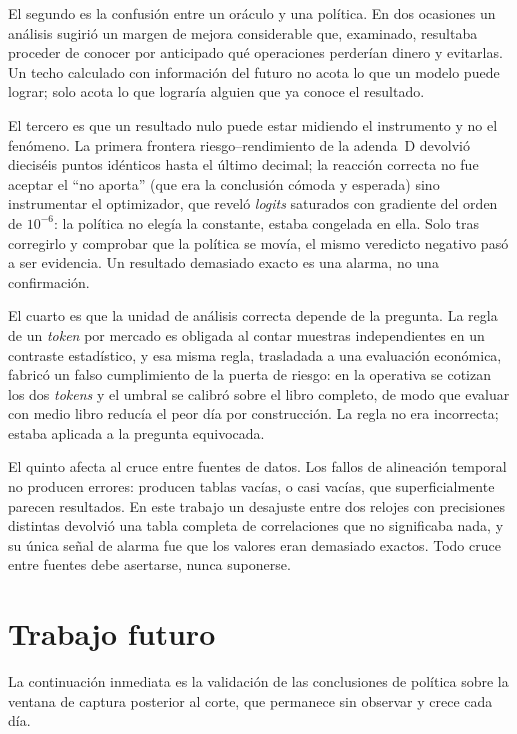 El segundo es la confusión entre un oráculo y una política. En dos ocasiones un análisis
sugirió un margen de mejora considerable que, examinado, resultaba proceder de conocer por
anticipado qué operaciones perderían dinero y evitarlas. Un techo calculado con información
del futuro no acota lo que un modelo puede lograr; solo acota lo que lograría alguien que ya
conoce el resultado.

El tercero es que un resultado nulo puede estar midiendo el instrumento y no el fenómeno.
La primera frontera riesgo--rendimiento de la adenda~D devolvió dieciséis puntos idénticos
hasta el último decimal; la reacción correcta no fue aceptar el ``no aporta'' (que era la
conclusión cómoda y esperada) sino instrumentar el optimizador, que reveló \emph{logits}
saturados con gradiente del orden de $10^{-6}$: la política no elegía la constante, estaba
congelada en ella. Solo tras corregirlo y comprobar que la política se movía, el mismo
veredicto negativo pasó a ser evidencia. Un resultado demasiado exacto es una alarma, no
una confirmación.

El cuarto es que la unidad de análisis correcta depende de la pregunta. La regla de un
\emph{token} por mercado es obligada al contar muestras independientes en un contraste
estadístico, y esa misma regla, trasladada a una evaluación económica, fabricó un falso
cumplimiento de la puerta de riesgo: en la operativa se cotizan los dos \emph{tokens} y el
umbral se calibró sobre el libro completo, de modo que evaluar con medio libro reducía el
peor día por construcción. La regla no era incorrecta; estaba aplicada a la pregunta
equivocada.

El quinto afecta al cruce entre fuentes de datos. Los fallos de alineación temporal no
producen errores: producen tablas vacías, o casi vacías, que superficialmente parecen
resultados. En este trabajo un desajuste entre dos relojes con precisiones distintas
devolvió una tabla completa de correlaciones que no significaba nada, y su única señal de
alarma fue que los valores eran demasiado exactos. Todo cruce entre fuentes debe asertarse,
nunca suponerse.

\section{Trabajo futuro}

La continuación inmediata es la validación de las conclusiones de política sobre la ventana
de captura posterior al corte, que permanece sin observar y crece cada día.

